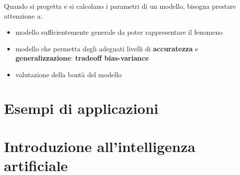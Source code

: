 {\color{red}
\vspace{10pt}
\noindent
Quando si progetta e si calcolano i parametri di un modello, bisogna prestare attenzione a:
\begin{itemize}
    \item modello sufficientemente generale da poter rappresentare il fenomeno
    \item modello che permetta degli adeguati livelli di \textbf{accuratezza} e \textbf{generalizzazione}: \textbf{tradeoff bias-variance}
    \item valutazione della bontà del modello
\end{itemize}
}


\chapter{Esempi di applicazioni}

\chapter{Introduzione all'intelligenza artificiale}


